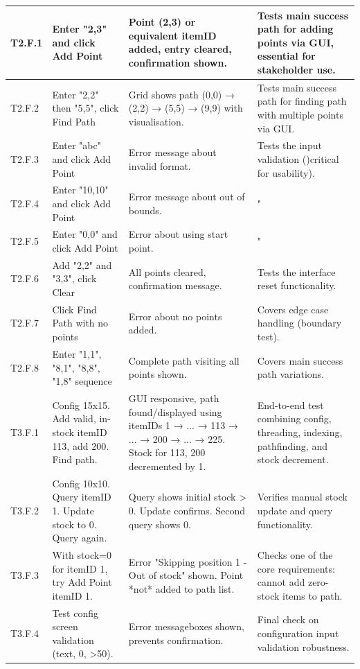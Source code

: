 \begin{longtable}{|p{}|p{}|p{}|p{}|}
T2.F.1 & Enter "2,3" and click Add Point & Point (2,3) or equivalent itemID added, entry cleared, confirmation shown. & Tests main success path for adding points via GUI, essential for stakeholder use. \\
\hline
T2.F.2 & Enter "2,2" then "5,5", click Find Path & Grid shows path (0,0) → (2,2) → (5,5) → (9,9) with visualisation. & Tests main success path for finding path with multiple points via GUI. \\
\hline
T2.F.3 & Enter "abc" and click Add Point & Error message about invalid format. & Tests the input validation ()critical for usability). \\
\hline
T2.F.4 & Enter "10,10" and click Add Point & Error message about out of bounds. & " \\
\hline
T2.F.5 & Enter "0,0" and click Add Point & Error about using start point. & " \\
\hline
T2.F.6 & Add "2,2" and "3,3", click Clear & All points cleared, confirmation message. & Tests the interface reset functionality. \\
\hline
T2.F.7 & Click Find Path with no points & Error about no points added. & Covers edge case handling (boundary test). \\
\hline
T2.F.8 & Enter "1,1", "8,1", "8,8", "1,8" sequence & Complete path visiting all points shown. & Covers main success path variations. \\
\hline

T3.F.1 & Config 15x15. Add valid, in-stock itemID 113, add 200. Find path. & GUI responsive, path found/displayed using itemIDs 1 → ... → 113 → ... → 200 → ... → 225. Stock for 113, 200 decremented by 1. & End-to-end test combining config, threading, indexing, pathfinding, and stock decrement. \\
\hline
T3.F.2 & Config 10x10. Query itemID 1. Update stock to 0. Query again. & Query shows initial stock > 0. Update confirms. Second query shows 0. & Verifies manual stock update and query functionality. \\
\hline
T3.F.3 & With stock=0 for itemID 1, try Add Point itemID 1. & Error "Skipping position 1 - Out of stock" shown. Point *not* added to path list. & Checks one of the core requirements: cannot add zero-stock items to path. \\
\hline
T3.F.4 & Test config screen validation (text, 0, >50). & Error messageboxes shown, prevents confirmation. & Final check on configuration input validation robustness. \\
\hline


\end{longtable}
